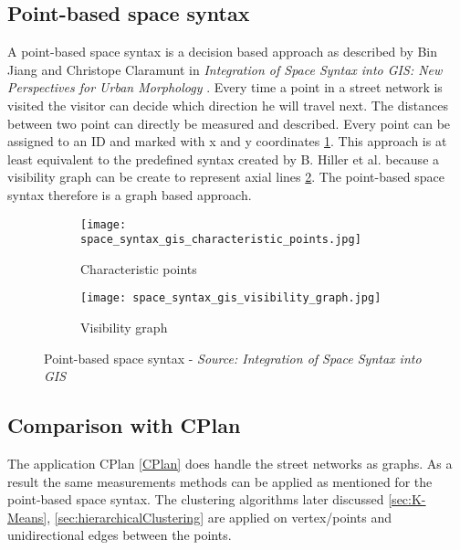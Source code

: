\subsection{Point-based space syntax}
A point-based space syntax is a decision based approach as described by Bin Jiang and Christope Claramunt in \textit{Integration of Space Syntax into GIS: New Perspectives for Urban Morphology} \citep{integrationSpaceSyntaxGIS:2002}. Every time a point in a street network is visited the visitor can decide which direction he will travel next. The distances between two point can directly be measured and described. Every point can be assigned to an ID and marked with x and y coordinates \ref{fig:space_syntax_gis_characteristic_points}. This approach is at least equivalent to the predefined syntax created by B. Hiller et al.\citep{spaceSyntax:1976} because a visibility graph can be create to represent axial lines \ref{fig:space_syntax_gis_visibility_graph}. The point-based space syntax therefore is a graph based approach.

\begin{figure}[ht]
    \centering
    \begin{subfigure}[b]{0.4\textwidth}
        \texttt{[image: space\_syntax\_gis\_characteristic\_points.jpg]}
        \caption{Characteristic points}
        \label{fig:space_syntax_gis_characteristic_points}
    \end{subfigure}
    \quad
    \begin{subfigure}[b]{0.4\textwidth}
        \texttt{[image: space\_syntax\_gis\_visibility\_graph.jpg]}
        \caption{Visibility graph}
        \label{fig:space_syntax_gis_visibility_graph}
    \end{subfigure}
    \caption{Point-based space syntax - \textit{Source: Integration of Space Syntax into GIS \citep{integrationSpaceSyntaxGIS:2002}}}
    \label{fig:space_syntax_gis}
\end{figure}

\subsection{Comparison with CPlan}
The application CPlan \ref{CPlan} does handle the street networks as graphs. As a result the same measurements methods can be applied as mentioned for the point-based space syntax. The clustering algorithms later discussed \ref{sec:K-Means}, \ref{sec:hierarchicalClustering} are applied on vertex/points and unidirectional edges between the points.